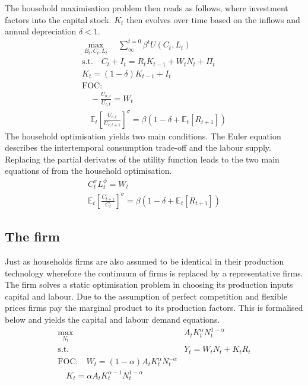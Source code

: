 \documentclass[12pt,a4paper,english]{article} %
\newcommand{\E}{\mathbb{E}} %
\begin{document}
	The household maximisation problem then reads as follows, where investment factors into the capital stock. $K_t$ then evolves over time based on the inflows and annual depreciation $\delta < 1$.
	\begin{equation}
		\begin{aligned}
			\max_{B_t, C_t, L_t} \quad \sum_{\infty}^{t=0} \beta^{t} U(C_{t}, L_{t}) \\
			\textrm{s.t.} \quad C_t + I_t = R_t K_{t-1} + W_t N_t + \Pi_t \\
						  K_t = (1 - \delta) K_{t-1} + I_t \\
			\textrm{FOC:}\\
							 \quad - \frac{U_{n,t}}{U_{c, t}} = W_t \\
							 \quad	\E_t \left[ \frac{U_{c,t}}{U_{c,t+1}} \right]^{\sigma} = \beta \left( 1 - \delta + \E_t[R_{t+1}]\right)
		\end{aligned}
	\end{equation}
	The household optimisation yields two main conditions. The Euler equation describes the intertemporal consumption trade-off and the labour supply. Replacing the partial derivates of the utility function leads to the two main equations of from the household optimisation.
	\begin{equation} \label{eq:rbc_hh_foc}
		\begin{aligned}
			C_t^\sigma L_t^\phi	= W_t \\
			\E_t \left[ \frac{C_{t+1}}{C_t} \right]^\sigma = \beta \left(1 - \delta  + \E_t [R_{t+1}] \right)
		\end{aligned}
	\end{equation}
	
	\subsection{The firm}
	Just as households firms are also assumed to be identical in their production technology wherefore the continuum of firms is replaced by a representative firms. The firm solves a static optimisation problem in choosing its production inputs capital and labour. Due to the assumption of perfect competition and flexible prices firms pay the marginal product to its production factors. This is formalised below and yields the capital and labour demand equations.
	\begin{equation} \label{eq:rbc_firm_foc}
		\begin{aligned}
			\max_{N_t} \quad & A_t K_t^\alpha N_t^{1 - \alpha} \\
			\textrm{s.t.} \quad & Y_t = W_t N_t + K_t R_t\\
			\textrm{FOC:} \quad W_t = (1 - \alpha) A_t K_t^\alpha N_t^{-\alpha}\\
							\quad K_t = \alpha A_t K_t^{\alpha -1} N_t^{1-\alpha}
		\end{aligned}
	\end{equation}
\end{document}
